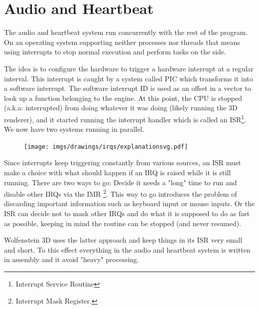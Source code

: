 \section{Audio and Heartbeat}
The audio and heartbeat system run concurrently with the rest of the program. On an operating system supporting neither processes nor threads that means using interrupts to stop normal execution and perform tasks on the side.\\
\par
The idea is to configure the hardware to trigger a hardware interrupt at a regular interval. This interrupt is caught by a system called PIC which transforms it into a software interrupt. The software interrupt ID is used as an offset in a vector to look up a function belonging to the engine. At this point, the CPU is stopped (a.k.a: interrupted) from doing whatever it was doing (likely running the 3D renderer), and it started running the interrupt handler which is called an ISR\footnote{Interrupt Service Routine}. We now have two systems running in parallel.\\
\par
\begin{figure}[H]
\centering
\texttt{[image: imgs/drawings/irqs/explanationsvg.pdf]}
 \end{figure}
\par
\par
 Since interrupts keep triggering constantly from various sources, an ISR must make a choice with what should happen if an IRQ is raised while it is still running. There are two ways to go: Decide it needs a "long" time to run and disable other IRQs via the IMR \footnote{Interrupt Mask Register.}. This way to go introduces the problem of discarding important information such as keyboard input or mouse inputs. Or the ISR can decide not to mask other IRQs and do what it is supposed to do as fast as possible, keeping in mind the routine can be stopped (and never resumed).\\
 \par
 Wolfenstein 3D uses the latter approach and keep things in its ISR very small and short. To this effect everything in the audio and heartbeat system is written in assembly and it avoid "heavy" processing.

